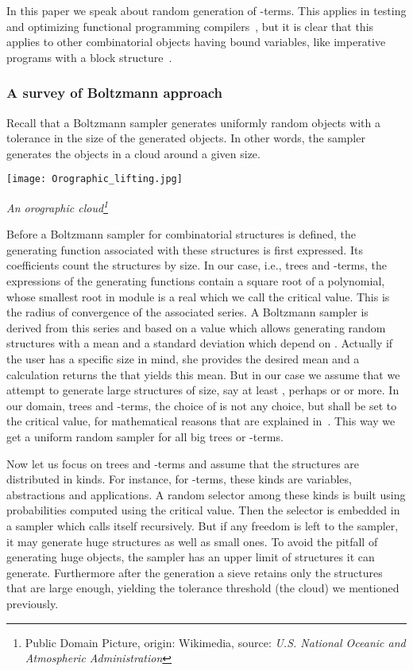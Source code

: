 \documentclass{sig-alternate}
\begin{document}
In this paper we speak about random generation of -terms.  This applies in
testing and optimizing functional programming
compilers~\cite{Palka:2011:TOC:1982595.1982615,palka12:_testin_compil}, but it is
clear that this applies to other combinatorial objects having bound variables, like
imperative programs with a block structure~\cite{DBLP:conf/pldi/YangCER11}.

\subsubsection*{A survey of Boltzmann approach}
Recall that a Boltzmann sampler  generates uniformly  random objects with a
tolerance in the size of the generated objects.  In other words, the sampler
generates the objects in a cloud around a given size.
\begin{center}
  \texttt{[image: Orographic\_lifting.jpg]}

  {\tiny \it An orographic cloud\footnote{Public Domain Picture, origin: Wikimedia,
      source: \emph{U.S. National Oceanic and Atmospheric Administration}}}
\end{center}


Before a Boltzmann sampler for combinatorial structures is defined, the generating
function associated with these structures is first expressed.  Its coefficients count
the structures by size.  In our case, i.e., trees and -terms, the expressions of
the generating functions contain a square root of a polynomial, whose smallest root
in module is a real which we call the critical value.  This is the radius of
convergence of the associated series.  A Boltzmann sampler is derived from this
series and based on a value  which allows generating random structures with a mean
and a standard deviation which depend on .  Actually if the user has a specific
size in mind, she provides the desired mean and a calculation returns the  that
yields this mean.  But in our case we assume that we attempt to generate large
structures of size, say at least , perhaps  or  or more. In our
domain, trees and -terms, the choice of  is not any choice, but  shall be
set to the critical value, for mathematical reasons that are explained
in~\cite{DBLP:journals/cpc/DuchonFLS04}.  This way we get a uniform random sampler
for all big trees or -terms.

Now let us focus on trees and -terms and assume that the structures are
distributed in kinds. For instance, for -terms, these kinds are variables,
abstractions and applications.  A random selector among these kinds is built using
probabilities computed using the critical value.  Then the selector is embedded in a
sampler which calls itself recursively.  But if any freedom is left to the sampler,
it may generate huge structures as well as small ones.  To avoid the pitfall of generating
huge objects, the sampler has an upper limit of structures it can
generate. Furthermore after the generation a sieve retains only the structures
that are large enough, yielding the tolerance threshold (the cloud) we mentioned
previously.
\end{document}
